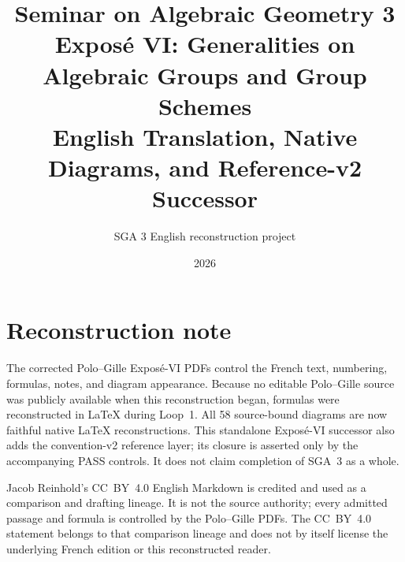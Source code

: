 \documentclass[11pt,a4paper,oneside]{book}
\title{Seminar on Algebraic Geometry 3\\
  \large Expos\'e VI: Generalities on Algebraic Groups and Group Schemes\\[0.75em]
  \normalsize English Translation, Native Diagrams, and Reference-v2 Successor}
\author{SGA 3 English reconstruction project}
\date{2026}
\begin{document}
\frontmatter
\maketitle

\chapter*{Reconstruction note}
The corrected Polo--Gille Expos\'e-VI PDFs control the French text,
numbering, formulas, notes, and diagram appearance. Because no editable
Polo--Gille source was publicly available when this reconstruction began,
formulas were reconstructed in \LaTeX{} during Loop~1. All 58
source-bound diagrams are now faithful native \LaTeX{} reconstructions.
This standalone Expos\'e-VI successor also adds the convention-v2 reference
layer; its closure is asserted only by the accompanying PASS controls. It
does not claim completion of SGA~3 as a whole.

Jacob Reinhold's CC~BY~4.0 English Markdown is credited and used as a
comparison and drafting lineage. It is not the source authority; every
admitted passage and formula is controlled by the Polo--Gille PDFs. The
CC~BY~4.0 statement belongs to that comparison lineage and does not by
itself license the underlying French edition or this reconstructed reader.

\tableofcontents
\mainmatter
\end{document}
